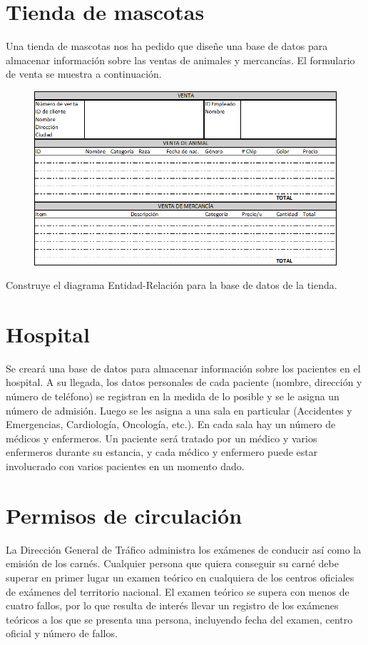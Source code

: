 \documentclass[a4paper]{article}
\begin{document}
\section{Tienda de mascotas}
Una tienda de mascotas nos ha pedido que diseñe una base de datos para almacenar información sobre las ventas de animales y mercancías. El formulario de venta se muestra a continuación.
\begin{figure}[h]
    \centering
    \includegraphics[width=\textwidth]{figs/mascotas}
\end{figure}
Construye el diagrama Entidad-Relación para la base de datos de la tienda.

\section{Hospital}
Se creará una base de datos para almacenar información sobre los pacientes en el hospital. A su llegada, los datos personales de cada paciente (nombre, dirección y número de teléfono) se registran en la medida de lo posible y se le asigna un número de admisión. Luego se les asigna a una sala en particular (Accidentes y Emergencias, Cardiología, Oncología, etc.). En cada sala hay un número de médicos y enfermeros. Un paciente será tratado por un médico y varios enfermeros durante su estancia, y cada médico y enfermero puede estar involucrado con varios pacientes en un momento dado.

\section{Permisos de circulación}
La Dirección General de Tráfico administra los exámenes de conducir así como la emisión de los carnés. Cualquier persona que quiera conseguir su carné debe superar en primer lugar un examen teórico en cualquiera de los centros oficiales de exámenes del territorio nacional. El examen teórico se supera con menos de cuatro fallos, por lo que resulta de interés llevar un registro de los exámenes teóricos a los que se presenta una persona, incluyendo fecha del examen, centro oficial y número de fallos.
\end{document}
